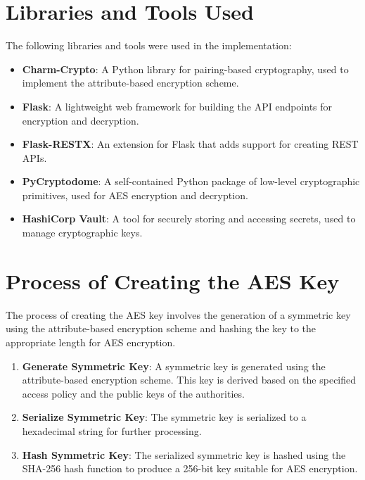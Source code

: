 


\section{Libraries and Tools Used}

The following libraries and tools were used in the implementation:

\begin{itemize}
    \item \textbf{Charm-Crypto}: A Python library for pairing-based cryptography, used to implement the attribute-based encryption scheme.
    \item \textbf{Flask}: A lightweight web framework for building the API endpoints for encryption and decryption.
    \item \textbf{Flask-RESTX}: An extension for Flask that adds support for creating REST APIs.
    \item \textbf{PyCryptodome}: A self-contained Python package of low-level cryptographic primitives, used for AES encryption and decryption.
    \item \textbf{HashiCorp Vault}: A tool for securely storing and accessing secrets, used to manage cryptographic keys.
\end{itemize}




\section{Process of Creating the AES Key}

The process of creating the AES key involves the generation of a symmetric key using the attribute-based encryption scheme and hashing the key to the appropriate length for AES encryption.

\begin{enumerate}
    \item \textbf{Generate Symmetric Key}: A symmetric key is generated using the attribute-based encryption scheme. This key is derived based on the specified access policy and the public keys of the authorities.
    \item \textbf{Serialize Symmetric Key}: The symmetric key is serialized to a hexadecimal string for further processing.
    \item \textbf{Hash Symmetric Key}: The serialized symmetric key is hashed using the SHA-256 hash function to produce a 256-bit key suitable for AES encryption.
\end{enumerate}

